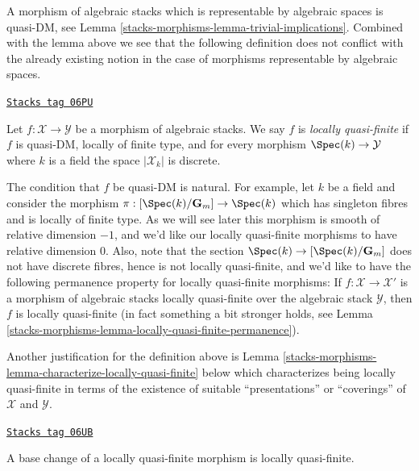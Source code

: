 A morphism of algebraic stacks which is representable by algebraic spaces
is quasi-DM, see
Lemma \ref{stacks-morphisms-lemma-trivial-implications}.
Combined with the lemma above we see that the following definition
does not conflict with the already existing notion in the case
of morphisms representable by algebraic spaces.

\begin{definition}
\label{stacks-morphisms-definition-locally-quasi-finite}
\href{https://stacks.math.columbia.edu/tag/06PU}{\texttt{Stacks tag 06PU}}

Let $f : \mathcal{X} \to \mathcal{Y}$ be a morphism of algebraic stacks.
We say $f$ is {\it locally quasi-finite} if $f$ is quasi-DM, locally of
finite type, and for every morphism $\Spec(k) \to \mathcal{Y}$
where $k$ is a field the space $|\mathcal{X}_k|$ is discrete.
\end{definition}

The condition that $f$ be quasi-DM is natural. For example, let $k$ be
a field and consider the morphism
$\pi : [\Spec(k)/\mathbf{G}_m] \to \Spec(k)$
which has singleton fibres and is locally of finite type. As we will see
later this morphism is smooth of relative dimension $-1$, and we'd
like our locally quasi-finite morphisms to have relative dimension $0$.
Also, note that the section $\Spec(k) \to [\Spec(k)/\mathbf{G}_m]$
does not have discrete fibres, hence is not locally quasi-finite, and we'd
like to have the following permanence property for locally quasi-finite
morphisms: If $f : \mathcal{X} \to \mathcal{X}'$ is a morphism of algebraic
stacks locally quasi-finite over the algebraic stack $\mathcal{Y}$, then
$f$ is locally quasi-finite (in fact something a bit stronger holds, see
Lemma \ref{stacks-morphisms-lemma-locally-quasi-finite-permanence}).

\medskip\noindent
Another justification for the definition above is
Lemma \ref{stacks-morphisms-lemma-characterize-locally-quasi-finite}
below which characterizes being locally quasi-finite in terms of the
existence of suitable ``presentations'' or ``coverings'' of
$\mathcal{X}$ and $\mathcal{Y}$.

\begin{lemma}
\label{stacks-morphisms-lemma-base-change-locally-quasi-finite}
\href{https://stacks.math.columbia.edu/tag/06UB}{\texttt{Stacks tag 06UB}}

A base change of a locally quasi-finite morphism is locally quasi-finite.
\end{lemma}

